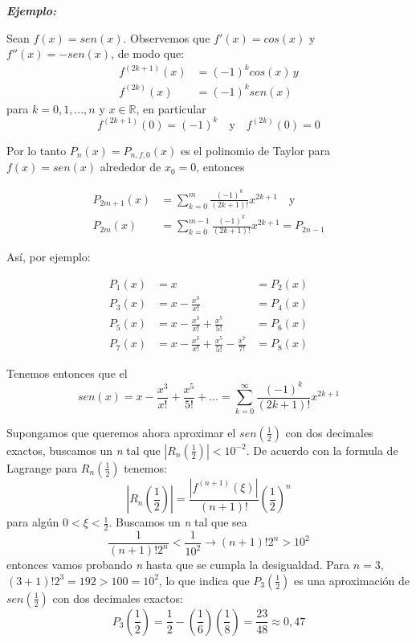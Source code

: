 \documentclass[12pt,a4paper]{article}
\begin{document}
\textbf{\textit{Ejemplo:}}

Sean \(f(x) = sen(x)\). Observemos que \(f'(x) = cos(x)\) y \(f''(x) = -sen(x)\), de modo que:
	\begin{align*}
	f^{(2k+1)}(x) &= (-1)^k cos(x) \, y \\
	f^{(2k)}(x) &= (-1)^k sen(x)
	\end{align*}
para \(k = 0,1,...,n\) y \(x \in \mathbb{R}\), en particular 
	\begin{equation*}
	f^{(2k+1)}(0) = (-1)^k \quad \text{y} \quad f^{(2k)}(0) = 0 
	\end{equation*}

Por lo tanto  \(P_n(x) = P_{n,f,0}(x)\) es el polinomio de Taylor para \(f(x) = sen(x)\) alrededor de \(x_0 = 0\), entonces

	\begin{align*}
	P_{2m+1}(x) &= \sum_{k=0}^{m} \frac{(-1)^k}{(2k+1)!} x^{2k+1} \quad \text{y} \\
	P_{2m}(x) &= \sum_{k=0}^{m-1} \frac{(-1)^k}{(2k+1)!} x^{2k+1} = P_{2n-1}
	\end{align*}
	
Así, por ejemplo:

	\begin{align*}
	P_1(x) &= x &= P_2(x) \\
	P_3(x) &= x - \frac{x^3}{x!} &= P_4(x) \\
	P_5(x) &= x - \frac{x^3}{x!} + \frac{x^5}{5!} &= P_6(x) \\
	P_7(x) &= x - \frac{x^3}{x!} + \frac{x^5}{5!} - \frac{x^7}{7!} &= P_8(x)
	\end{align*}
	
Tenemos entonces que el 
	\begin{equation}
	sen(x) = x - \frac{x^3}{x!} + \frac{x^5}{5!} + \dots = \sum_{k=0}^{\infty} \frac{(-1)^k}{(2k+1)!} x^{2k+1}
	\end{equation}

Supongamos que queremos ahora aproximar el \(sen (\frac{1}{2})\) con dos decimales exactos, buscamos un \textit{n} tal que \(|R_n(\frac{1}{2})| < 10^{-2}\). De acuerdo con la formula de Lagrange para \(R_n(\frac{1}{2})\) tenemos:
	\begin{equation*}
	\left|R_n(\frac{1}{2})\right| = \frac{\left|f^{(n+1)}(\xi)\right|}{(n+1)!} \left(\frac{1}{2}\right)^n
	\end{equation*}
para algún \(0<\xi< \frac{1}{2}\). Buscamos un \textit{n} tal que sea 
	\begin{equation*}
	\frac{1}{(n+1)!2^n} < \frac{1}{10^2} \rightarrow (n+1)!2^n > 10^2
	\end{equation*}  
entonces vamos probando \textit{n} hasta que se cumpla la desigualdad. Para \(n=3\), \((3+1)!2^3 = 192 > 100 = 10^2\), lo que indica que \(P_3(\frac{1}{2})\) es una aproximación de \(sen(\frac{1}{2})\) con dos decimales exactos:
	\begin{equation*}
	P_3(\frac{1}{2}) = \frac{1}{2} - \left( \frac{1}{6} \right) \left( \frac{1}{8} \right) = \frac{23}{48} \approx 0,47
	\end{equation*}
\end{document}
